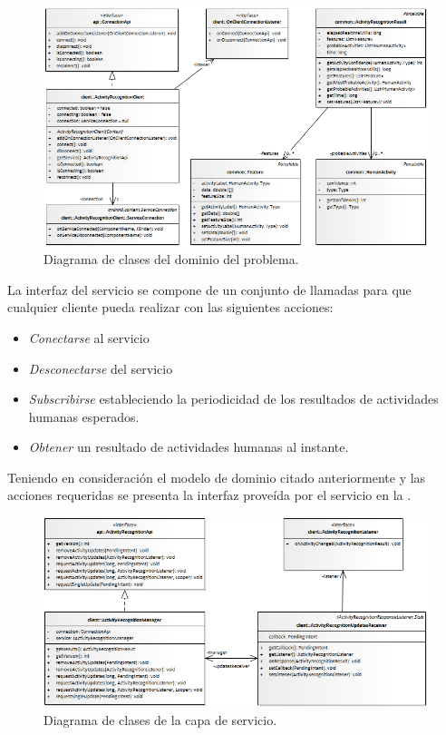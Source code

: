 \begin{figure}[H]
\begin{centering}
\includegraphics[width=1\columnwidth]{capitulo-5/graphics/class_domain}
\par\end{centering}
\caption[Diagrama de clases del dominio del problema]{\label{fig5:domain-model}Diagrama de clases del dominio del problema.}

\end{figure}

La interfaz del servicio se compone de un conjunto de llamadas para
que cualquier cliente pueda realizar con las siguientes acciones:
\begin{itemize}
\item \emph{Conectarse} al servicio
\item \emph{Desconectarse} del servicio
\item \emph{Subscribirse} estableciendo la periodicidad de los resultados
de actividades humanas esperados. 
\item \emph{Obtener} un resultado de actividades humanas al instante.
\end{itemize}
Teniendo en consideración el modelo de dominio citado anteriormente
y las acciones requeridas se presenta la interfaz proveída por el
servicio en la .

\begin{figure}[H]
\begin{centering}
\includegraphics[width=1\columnwidth]{capitulo-5/graphics/class_service}
\par\end{centering}
\caption[Diagrama de clases de la capa de servicio]{\label{fig5:service-layer}Diagrama de clases de la capa de servicio.}

\end{figure}

